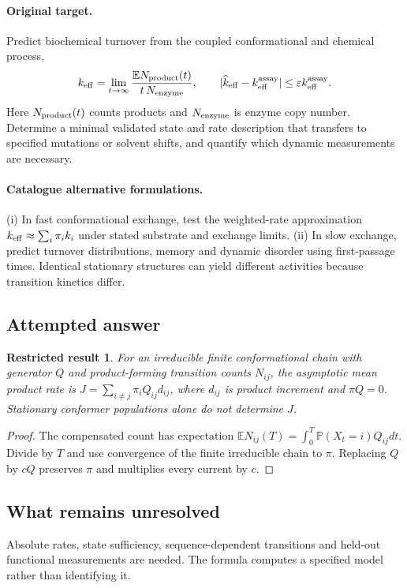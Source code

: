 \documentclass[11pt]{article}
\newcommand{\E}{\mathbb E}
\newcommand{\Prob}{\mathbb P}
\providecommand{\E}{\mathbb E}
\providecommand{\Prob}{\mathbb P}
\newtheorem{attemptresult}{Restricted result}[section]
\begin{document}
\paragraph{Original target.}
Predict biochemical turnover from the coupled conformational and chemical process,
\[k_{\rm eff}=\lim_{t\to\infty}\frac{\E N_{
\rm product}(t)}{t\,N_{
\rm enzyme}},\qquad |\widehat k_{\rm eff}-k_{\rm eff}^{\rm assay}|\le\varepsilon k_{\rm eff}^{\rm assay}.\]
Here $N_{\rm product}(t)$ counts products and $N_{\rm enzyme}$ is enzyme copy number. Determine a minimal validated state and rate description that transfers to specified mutations or solvent shifts, and quantify which dynamic measurements are necessary.
\paragraph{Catalogue alternative formulations.}
(i) In fast conformational exchange, test the weighted-rate approximation $k_{\rm eff}\approx\sum_i\pi_i k_i$ under stated substrate and exchange limits. (ii) In slow exchange, predict turnover distributions, memory and dynamic disorder using first-passage times. Identical stationary structures can yield different activities because transition kinetics differ.
\subsection{Attempted answer}
\begin{attemptresult}
For an irreducible finite conformational chain with generator $Q$ and product-forming transition counts $N_{ij}$, the asymptotic mean product rate is $J=\sum_{i\ne j}\pi_iQ_{ij}d_{ij}$, where $d_{ij}$ is product increment and $\pi Q=0$. Stationary conformer populations alone do not determine $J$.
\end{attemptresult}
\begin{proof}
The compensated count has expectation $\E N_{ij}(T)=\int_0^T\Prob(X_t=i)Q_{ij}dt$. Divide by $T$ and use convergence of the finite irreducible chain to $\pi$. Replacing $Q$ by $cQ$ preserves $\pi$ and multiplies every current by $c$.
\end{proof}
\subsection{What remains unresolved}
Absolute rates, state sufficiency, sequence-dependent transitions and held-out functional measurements are needed. The formula computes a specified model rather than identifying it.
\end{document}
